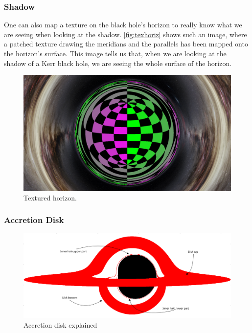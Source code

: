 \subsubsection*{Shadow}

One can also map a texture on the black hole's horizon to really know what we are seeing when looking at the shadow. \autoref{fig:texhoriz} shows such an image, where a patched texture drawing the meridians and the parallels has been mapped onto the horizon's surface. This image tells us that, when we are looking at the shadow of a Kerr black hole, we are seeing the whole surface of the horizon.

\begin{figure}[bth]
	\myfloatalign
	\includegraphics[width=.8\linewidth]{gfx/gridhorizon}
	\caption[Textured horizon]{Textured horizon.}
	\label{fig:texhoriz}
\end{figure}

\subsubsection*{Accretion Disk}

\begin{figure}[bth]
	\myfloatalign
	\includegraphics[width=\linewidth]{gfx/bh_simple}
	\caption[Accretion disk explained]{Accretion disk explained}
	\label{fig:explanation}
\end{figure}

